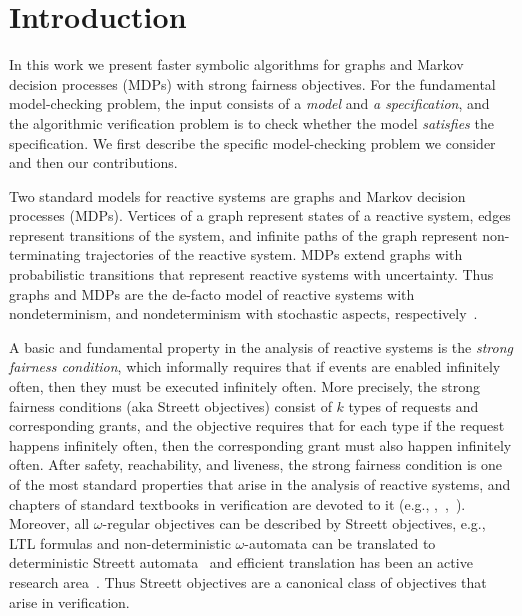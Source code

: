 \vspace{-4mm}
\section{Introduction}\label{sec:intro}
\vspace{-1mm}

In this work we present faster symbolic algorithms for graphs and Markov decision 
processes (MDPs) with strong fairness objectives.
For the fundamental model-checking problem, the input consists of a {\em model} and 
{\em a specification}, and the algorithmic verification problem is to check whether 
the model {\em satisfies} the specification. 
We first describe the specific model-checking problem we consider and then our 
contributions. 

\vspace{-0.5mm}
\smallskip{}
Two standard models for reactive systems are graphs and Markov decision processes (MDPs).
Vertices of a graph represent states of a reactive system, edges represent transitions 
of the system, and infinite paths of the graph represent non-terminating trajectories 
of the reactive system.
MDPs extend graphs with probabilistic transitions that represent reactive systems with 
uncertainty. 
Thus graphs and MDPs are the de-facto model of reactive systems with nondeterminism,
and nondeterminism with stochastic aspects, respectively~\cite{ClarkeBook,baierbook}.

\vspace{-0.5mm}
\smallskip{}
A basic and fundamental property in the analysis of reactive systems is the 
{\em strong fairness condition}, which informally requires that if events are enabled infinitely often, then 
they must be executed infinitely often.
More precisely, the strong fairness conditions (aka Streett objectives) consist of 
$k$ types of requests and corresponding grants, and the objective requires that for each 
type if the request happens infinitely often, then the corresponding grant must also happen
infinitely often. 
After safety, reachability, and liveness, the strong fairness condition is one of the most
standard properties that arise in the analysis of reactive systems, and chapters 
of standard textbooks in verification are devoted to it (e.g., 
\cite[Chapter~3.3]{ClarkeBook},~\cite[Chapter~3]{MPProgress},~\cite[Chapters~8,~10]{AlurHenzingerBook}). 
Moreover, all $\omega$-regular objectives can be described by Streett objectives, e.g., 
LTL formulas and non-deterministic $\omega$-automata can be translated to
deterministic Streett automata~\cite{Safra88} and efficient translation
has been an active research area~\cite{ChatterjeeGK13,EsparzaK14,KomarkovaK14}. 
Thus Streett objectives are a canonical class of objectives that arise in verification.

